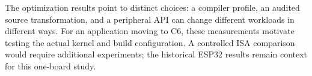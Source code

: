 \documentclass[10pt]{article}
\begin{document}
The optimization results point to distinct choices: a compiler profile, an audited source transformation, and a peripheral API can change different workloads in different ways. For an application moving to C6, these measurements motivate testing the actual kernel and build configuration. A controlled ISA comparison would require additional experiments; the historical ESP32 results remain context for this one-board study.


\begingroup\scriptsize\setlength{\bibsep}{0pt}\endgroup
\end{document}
